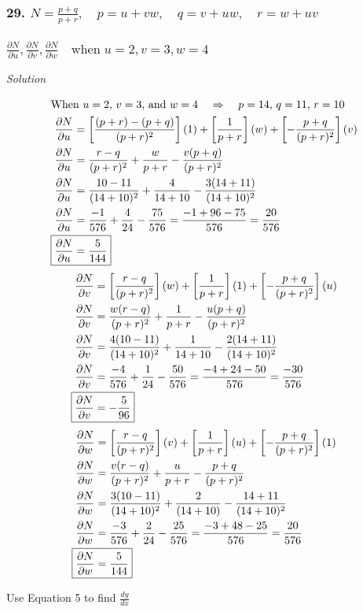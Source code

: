 \documentclass{article}
\newcommand\rr{\quad\Rightarrow\quad}
\newcommand{\solution}{\centerline{\textit{Solution}}}
\newcommand{\pp}[2]{\displaystyle\frac{\partial #1}{\partial #2}}
\newcommand{\dd}[2]{\displaystyle\frac{d #1}{d #2}}
\newcommand{\bb}[1]{\left[#1\right]}
\begin{document}
\subsubsection*{29. 
    $N = \displaystyle\frac{p+q}{p+r},\quad p=u+vw,\quad q=v+uw,\quad
    r=w+uv$\;\\\\
    $\pp N u, \pp N v, \pp N w\quad \text{when}\; u=2,v=3,w=4$
}
\solution
\begin{align*}
    \intertext{When $u=2$, $v=3$, and $w=4$ $\rr$ $p=14$, $q=11$, $r=10$}
    \pp N u &=
    \bb{\displaystyle\frac{(p+r)-(p+q)}{(p+r)^2}}(1)+\bb{\displaystyle\frac{1}{p+r}}(w)+\bb{-\displaystyle\frac{p+q}{(p+r)^2}}(v)
    \\
    \pp N u &=
    \displaystyle\frac{r-q}{(p+r)^2}+\displaystyle\frac{w}{p+r}-\displaystyle\frac{v(p+q)}{(p+r)^2} \\
    \pp N u &=
    \displaystyle\frac{10-11}{(14+10)^2}+\displaystyle\frac{4}{14+10}-\displaystyle\frac{3(14+11)}{(14+10)^2} \\
    \pp N u &= \displaystyle\frac{-1}{576}+\displaystyle\frac{4}{24}-\displaystyle\frac{75}{576} = \displaystyle\frac{-1+96-75}{576} = \displaystyle\frac{20}{576} \\
    \Aboxed{\pp N u &= \displaystyle\frac{5}{144}}
\end{align*}
\begin{align*}
    \pp N v &=
    \bb{\displaystyle\frac{r-q}{(p+r)^2}}(w)+\bb{\displaystyle\frac{1}{p+r}}(1)+\bb{-\displaystyle\frac{p+q}{(p+r)^2}}(u)
    \\
    \pp N v &=
    \displaystyle\frac{w(r-q)}{(p+r)^2}+\displaystyle\frac{1}{p+r}-\displaystyle\frac{u(p+q)}{(p+r)^2} \\
    \pp N v &=
    \displaystyle\frac{4(10-11)}{(14+10)^2}+\displaystyle\frac{1}{14+10}-\displaystyle\frac{2(14+11)}{(14+10)^2} \\
    \pp N v &= \displaystyle\frac{-4}{576}+\displaystyle\frac{1}{24}-\displaystyle\frac{50}{576}
            = \displaystyle\frac{-4+24-50}{576}=\displaystyle\frac{-30}{576} \\
    \Aboxed{\pp N v &= -\displaystyle\frac{5}{96}}
\end{align*}
\begin{align*}
    \pp N w &=
    \bb{\displaystyle\frac{r-q}{(p+r)^2}}(v)+\bb{\displaystyle\frac{1}{p+r}}(u)+\bb{-\displaystyle\frac{p+q}{(p+r)^2}}(1) \\
    \pp N w &=
    \displaystyle\frac{v(r-q)}{(p+r)^2}+\displaystyle\frac{u}{p+r}-\displaystyle\frac{p+q}{(p+r)^2} \\
    \pp N w &=
    \displaystyle\frac{3(10-11)}{(14+10)^2}+\displaystyle\frac{2}{(14+10)}-\displaystyle\frac{14+11}{(14+10)^2}
    \\
    \pp N w &=
    \displaystyle\frac{-3}{576}+\displaystyle\frac{2}{24}-\displaystyle\frac{25}{576} = \displaystyle\frac{-3+48-25}{576}=\displaystyle\frac{20}{576} \\
    \Aboxed{\pp N w &= \displaystyle\frac{5}{144}}
\end{align*}
\newpage
\begin{center}
    Use Equation 5 to find $\dd y x$ 
\end{center}
\end{document}
